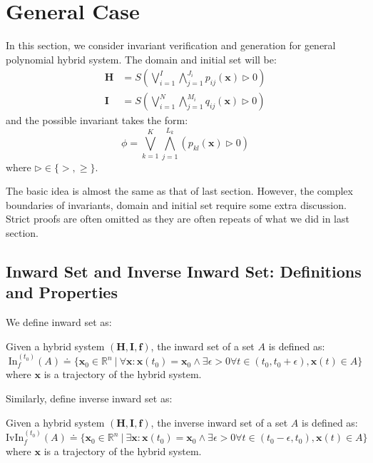 \documentclass{jssc}
\begin{document}
\section{General Case}
\label{sec:general}
In this section, we consider invariant verification and generation for general polynomial hybrid system. The domain and initial set will be:
\begin{align*}
	\boldsymbol{H} &= S(\bigvee_{i=1}^I \bigwedge_{j=1}^{J_i} p_{ij}(\boldsymbol{x}) \rhd 0) \\
	\boldsymbol{I} &= S(\bigvee_{i=1}^N \bigwedge_{j=1}^{M_i} q_{ij}(\boldsymbol{x}) \rhd 0)
\end{align*}
and the possible invariant takes the form:
\begin{equation*}
	\phi = \bigvee_{k=1}^K \bigwedge_{j=1}^{L_k} (p_{kl}(\boldsymbol{x}) \rhd 0)
\end{equation*}
where $\rhd \in \{ >, \geq \}$.

The basic idea is almost the same as that of last section. However, the complex boundaries of invariants, domain and initial set require some extra discussion. Strict proofs are often omitted as they are often repeats of what we did in last section.

\subsection{Inward Set and Inverse Inward Set: Definitions and Properties}
We define inward set as:
\begin{definition}
\label{def:in}
Given a hybrid system $(\boldsymbol{H}, \boldsymbol{I}, \boldsymbol{f})$, the inward set of a set $A$ is defined as: 
\begin{equation*}
	\mathrm{In}_f^{(t_0)}(A) \doteq \{ \boldsymbol{x}_0 \in \mathbb{R}^n\ |\ \forall \boldsymbol{x}: \boldsymbol{x}(t_0) = \boldsymbol{x}_0 \wedge \exists \epsilon > 0 \forall t \in (t_0, t_0 + \epsilon), \boldsymbol{x}(t) \in A \}
\end{equation*}
where $\boldsymbol{x}$ is a trajectory of the hybrid system.
\end{definition}

Similarly, define inverse inward set as:
\begin{definition}
\label{def:ivin}
Given a hybrid system $(\boldsymbol{H}, \boldsymbol{I}, \boldsymbol{f})$, the inverse inward set of a set $A$ is defined as: 
\begin{equation*}
	\mathrm{IvIn}_f^{(t_0)}(A) \doteq \{ \boldsymbol{x}_0 \in \mathbb{R}^n\ |\ \exists \boldsymbol{x}: \boldsymbol{x}(t_0) = \boldsymbol{x}_0 \wedge \exists \epsilon > 0 \forall t \in (t_0 - \epsilon, t_0), \boldsymbol{x}(t) \in A \}
\end{equation*}
where $\boldsymbol{x}$ is a trajectory of the hybrid system.
\end{definition}
\end{document}
